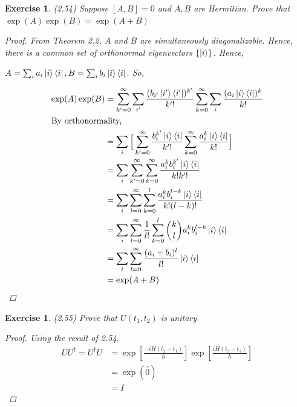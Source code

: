 \documentclass[11pt]{article}
\newcommand\0{\mathbf{0}}
\newcommand\<{\langle}
\renewcommand\>{\rangle}
\newtheorem{exercise}[theorem]{Exercise}
\begin{document}
\begin{exercise}
(2.54) Suppose $[A, B] = 0$ and $A, B$ are Hermitian. Prove that $\exp(A)\exp(B) = \exp(A + B)$

\begin{proof}
	From Theorem 2.2, $A$ and $B$ are simultaneously diagonalizable. Hence, there is a common set of orthonormal eigenvectors $\{ \ket{i} \}$. Hence,
	
	$A = \sum_i a_i \ket{i}\bra{i}, B = \sum_i b_i \ket{i}\bra{i}$. So, 
	
	\begin{align*}
	\exp(A)\exp(B) &= \sum_{k'=0}^\infty\sum_{i'} \frac{(b_{i'} \ket{i'}\bra{i'})^{k'}}{k'!}\sum_{k=0}^\infty\sum_{i} \frac{(a_i \ket{i}\bra{i})^k}{k!} \\
	\intertext{By orthonormality,}
	&= \sum_{i}\Big[\sum_{k'=0}^\infty \frac{b_i^{k'} \ket{i}\bra{i}}{k'!}\sum_{k=0}^\infty \frac{a_i^k \ket{i}\bra{i}}{k!}\Big] \\
	&= \sum_{i}\sum_{k'=0}^\infty\sum_{k=0}^\infty \frac{a_i^k b_i^{k'} \ket{i}\bra{i}}{k!k'!}\\
	&= \sum_{i}\sum_{l=0}^\infty\sum_{k=0}^l \frac{a_i^k b_i^{l-k} \ket{i}\bra{i}}{k!(l-k)!}\\
	&= \sum_{i}\sum_{l=0}^\infty \frac{1}{l!}\sum_{k=0}^l \binom{k}{l} a_i^k b_i^{l-k} \ket{i}\bra{i} \\
	&= \sum_{i}\sum_{l=0}^\infty \frac{(a_i +b_i)^l}{l!} \ket{i}\bra{i} \\
	&= \exp(A + B)
	\end{align*}
\end{proof}
\end{exercise}

\begin{exercise}
(2.55) Prove that $U(t_1, t_2)$ is unitary	
\begin{proof}

Using the result of 2.54, 
	\begin{align*}
	UU^\dag = U^\dag U &= \exp[\frac{-iH(t_2 - t_1)}{\hbar}]\exp[\frac{iH(t_2 - t_1)}{\hbar}] \\
	&= 	\exp(\hat{0}) \\
	&= 	I
	\end{align*}
\end{proof}
\end{exercise}
\end{document}
